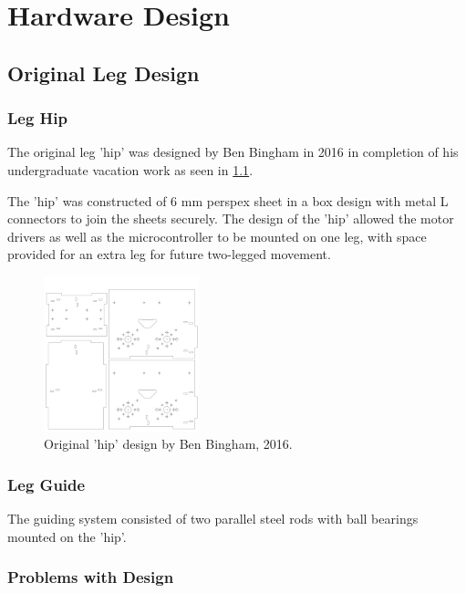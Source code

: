 \chapter{Hardware Design}

\section{Original Leg Design}

\subsection{Leg Hip}
The original leg 'hip' was designed by Ben Bingham in 2016 in completion of his undergraduate vacation work as seen in \cref{fig:original-hip}.

The 'hip' was constructed of 6 mm perspex sheet in a box design with metal L connectors to join the sheets securely. The design of the 'hip' allowed the motor drivers as well as the microcontroller to be mounted on one leg, with space provided for an extra leg for future two-legged movement. 

\begin{figure}
\centering
\includegraphics[clip, trim =0cm 0cm 0cm 0cm, page =1, width=0.4\textwidth]{images/mechanical/hip-6mm-360x360}
\caption{Original 'hip' design by Ben Bingham, 2016.}
\label{fig:original-hip}
\end{figure}

\subsection{Leg Guide}
The guiding system consisted of two parallel steel rods with ball bearings mounted on the 'hip'. 

\subsection{Problems with Design}

